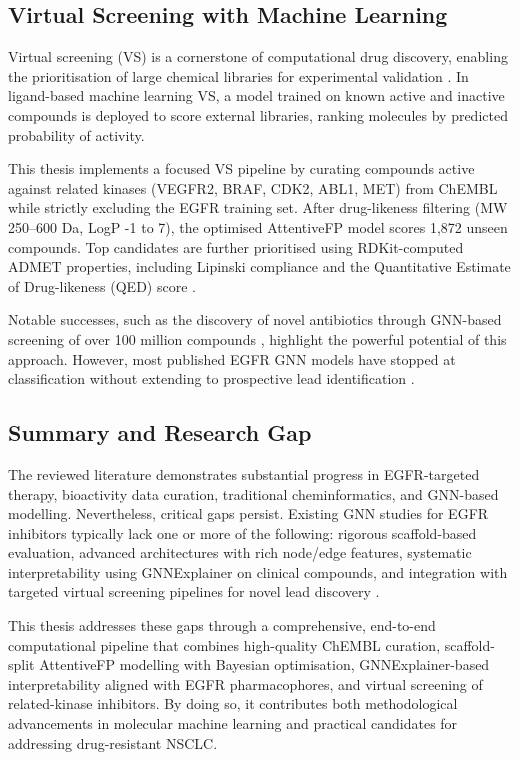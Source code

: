 \subsection{Virtual Screening with Machine Learning}

Virtual screening (VS) is a cornerstone of computational drug discovery, enabling the prioritisation of large chemical libraries for experimental validation \parencite{Wangetal2023, Sunetal2021}. In ligand-based machine learning VS, a model trained on known active and inactive compounds is deployed to score external libraries, ranking molecules by predicted probability of activity.

This thesis implements a focused VS pipeline by curating compounds active against related kinases (VEGFR2, BRAF, CDK2, ABL1, MET) from ChEMBL while strictly excluding the EGFR training set. After drug-likeness filtering (MW 250--600 Da, LogP -1 to 7), the optimised AttentiveFP model scores 1,872 unseen compounds. Top candidates are further prioritised using RDKit-computed ADMET properties, including Lipinski compliance and the Quantitative Estimate of Drug-likeness (QED) score \parencite{Wangetal2023, Tropshaetal2020}.

Notable successes, such as the discovery of novel antibiotics through GNN-based screening of over 100 million compounds \parencite{Stokesetal2020}, highlight the powerful potential of this approach. However, most published EGFR GNN models have stopped at classification without extending to prospective lead identification \parencite{Stokesetal2020, Maliketal2025}.

\subsection{Summary and Research Gap}

The reviewed literature demonstrates substantial progress in EGFR-targeted therapy, bioactivity data curation, traditional cheminformatics, and GNN-based modelling. Nevertheless, critical gaps persist. Existing GNN studies for EGFR inhibitors typically lack one or more of the following: rigorous scaffold-based evaluation, advanced architectures with rich node/edge features, systematic interpretability using GNNExplainer on clinical compounds, and integration with targeted virtual screening pipelines for novel lead discovery \parencite{Maliketal2025, Jiangetal2021, Luoetal2022}.

This thesis addresses these gaps through a comprehensive, end-to-end computational pipeline that combines high-quality ChEMBL curation, scaffold-split AttentiveFP modelling with Bayesian optimisation, GNNExplainer-based interpretability aligned with EGFR pharmacophores, and virtual screening of related-kinase inhibitors. By doing so, it contributes both methodological advancements in molecular machine learning and practical candidates for addressing drug-resistant NSCLC.

\newpage